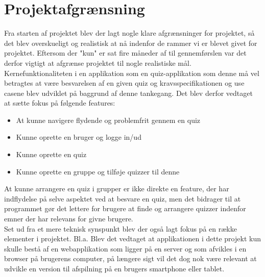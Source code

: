 \chapter{Projektafgrænsning}

Fra starten af projektet blev der lagt nogle klare afgrænsninger for projektet, så det blev overskueligt og realistisk at nå indenfor de rammer vi er blevet givet for projektet. Eftersom der "kun" er sat fire måneder af til gennemførslen var det derfor vigtigt at afgrænse projektet til nogle realistiske mål. \\
Kernefunktionaliteten i en applikation som en quiz-applikation som denne må vel betragtes at være besvarelsen af en given quiz og kravsspecifikationen og use casene blev udviklet på baggrund af denne tankegang. Det blev derfor vedtaget at sætte fokus på følgende features:

\begin{itemize}
\item At kunne navigere flydende og problemfrit gennem en quiz
\item Kunne oprette en bruger og logge in/ud
\item Kunne oprette en quiz
\item Kunne oprette en gruppe og tilføje quizzer til denne
\end{itemize}

At kunne arrangere en quiz i grupper er ikke direkte en feature, der har indflydelse på selve aspektet ved at besvare en quiz, men det bidrager til at programmet gør det lettere for brugere at finde og arrangere quizzer indenfor emner der har relevans for givne brugere.\\


Set ud fra et mere teknisk synspunkt blev der også lagt fokus på en række elementer i projektet. Bl.a. Blev det vedtaget at  applikationen i dette projekt kun skulle bestå af en webapplikation som ligger på en server og som afvikles i en browser på brugerens computer, på længere sigt vil det dog nok være relevant at udvikle en version til afspilning på en brugers smartphone eller tablet.
